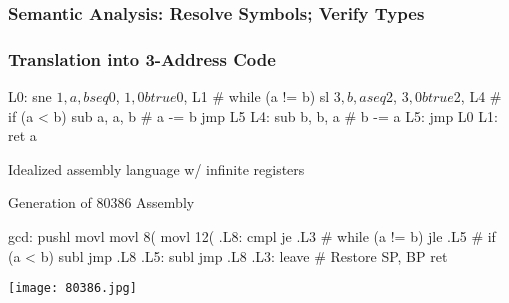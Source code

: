 \documentclass{plt}
\begin{document}
\renewcommand{\id}[1]{
  node [fill=white] (id) {#1}
  (id) .. controls +(-1,-2) and +(1,0) .. (#1.east)
}

\begin{frame}
  \frametitle{Semantic Analysis: Resolve Symbols; Verify Types}


\end{frame}


\begin{frame}[fragile]
  \frametitle{Translation into 3-Address Code}

\begin{assembly}
L0: sne   $1,  a, b
    seq   $0, $1, 0
    btrue $0, L1    # while (a != b)
    sl    $3,  b, a
    seq   $2, $3, 0
    btrue $2, L4    # if (a < b)
    sub   a,   a, b # a -= b
    jmp   L5
L4: sub   b,   b, a # b -= a
L5: jmp   L0
L1: ret   a
\end{assembly}

\usebox{\gcdbox}\hfill\parbox{14pc}{\raggedright
Idealized assembly language w/ infinite registers
}

%
%

\end{frame}



\begin{frame}[fragile]{Generation of 80386 Assembly}

\begin{assembly}
gcd:  pushl %
      movl  %
      movl  8(%
      movl  12(%
.L8:  cmpl  %
      je    .L3           # while (a != b)
      jle   .L5           # if (a < b)
      subl  %
      jmp   .L8
.L5:  subl  %
      jmp   .L8
.L3:  leave               # Restore SP, BP
      ret
\end{assembly}

\raisebox{2pc}{\scalebox{0.75}{\usebox{\gcdbox}}}\hfill \texttt{[image: 80386.jpg]}


\end{frame}
\end{document}
